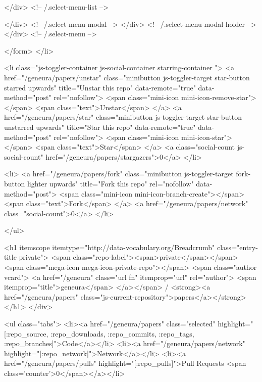           </div> <!-- /.select-menu-list -->

        </div> <!-- /.select-menu-modal -->
      </div> <!-- /.select-menu-modal-holder -->
    </div> <!-- /.select-menu -->

</form>
    </li>

    <li class="js-toggler-container js-social-container starring-container ">
      <a href="/geneura/papers/unstar" class="minibutton js-toggler-target star-button starred upwards" title="Unstar this repo" data-remote="true" data-method="post" rel="nofollow">
        <span class="mini-icon mini-icon-remove-star"></span>
        <span class="text">Unstar</span>
      </a>
      <a href="/geneura/papers/star" class="minibutton js-toggler-target star-button unstarred upwards" title="Star this repo" data-remote="true" data-method="post" rel="nofollow">
        <span class="mini-icon mini-icon-star"></span>
        <span class="text">Star</span>
      </a>
      <a class="social-count js-social-count" href="/geneura/papers/stargazers">0</a>
    </li>

        <li>
          <a href="/geneura/papers/fork" class="minibutton js-toggler-target fork-button lighter upwards" title="Fork this repo" rel="nofollow" data-method="post">
            <span class="mini-icon mini-icon-branch-create"></span>
            <span class="text">Fork</span>
          </a>
          <a href="/geneura/papers/network" class="social-count">0</a>
        </li>


</ul>

              <h1 itemscope itemtype="http://data-vocabulary.org/Breadcrumb" class="entry-title private">
                <span class="repo-label"><span>private</span></span>
                <span class="mega-icon mega-icon-private-repo"></span>
                <span class="author vcard">
                  <a href="/geneura" class="url fn" itemprop="url" rel="author">
                  <span itemprop="title">geneura</span>
                  </a></span> /
                <strong><a href="/geneura/papers" class="js-current-repository">papers</a></strong>
              </h1>
            </div>

            
  <ul class="tabs">
    <li><a href="/geneura/papers" class="selected" highlight="[:repo_source, :repo_downloads, :repo_commits, :repo_tags, :repo_branches]">Code</a></li>
    <li><a href="/geneura/papers/network" highlight="[:repo_network]">Network</a></li>
    <li><a href="/geneura/papers/pulls" highlight="[:repo_pulls]">Pull Requests <span class='counter'>0</span></a></li>

